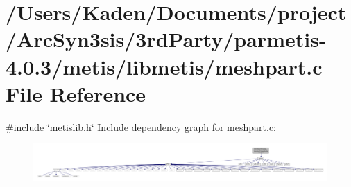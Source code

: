 \hypertarget{a00236}{}\section{/\+Users/\+Kaden/\+Documents/project/\+Arc\+Syn3sis/3rd\+Party/parmetis-\/4.0.3/metis/libmetis/meshpart.c File Reference}
\label{a00236}
{\ttfamily \#include \char`\"{}metislib.\+h\char`\"{}}\newline
Include dependency graph for meshpart.\+c\+:\nopagebreak
\begin{figure}[H]
\begin{center}
\leavevmode
\includegraphics[width=350pt]{a00237}
\end{center}
\end{figure}
